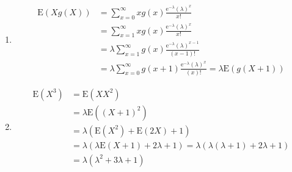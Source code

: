 \begin{enumerate}[label=(\alph*)]
\item 
\begin{align*}
\text{E}(Xg(X)) &= \sum_{x=0}^{\infty}xg(x)\frac{\text{e}^{-\lambda}
(\lambda)^{x}}{x!} \\
&= \sum_{x=1}^{\infty}xg(x)\frac{\text{e}^{-\lambda}
(\lambda)^{x}}{x!} \\
&= \lambda\sum_{x=1}^{\infty}g(x)\frac{\text{e}^{-\lambda}
(\lambda)^{x-1}}{(x-1)!} \\
&= \lambda\sum_{x=0}^{\infty}g(x+1)\frac{\text{e}^{-\lambda}
(\lambda)^{x}}{(x)!} = \lambda\text{E}(g(X+1))
\end{align*}

\item 
\begin{align*}
\text{E}(X^{3}) &= \text{E}(XX^{2}) \\
&= \lambda\text{E}((X+1)^{2}) \\
&= \lambda(\text{E}(X^{2}) + \text{E}(2X) + 1) \\
&= \lambda(\lambda\text{E}(X+1) +
2\lambda + 1) = \lambda(\lambda(\lambda + 1) + 2\lambda + 1) \\
&= \lambda(\lambda^{2} + 3\lambda + 1)
\end{align*}
\end{enumerate}
